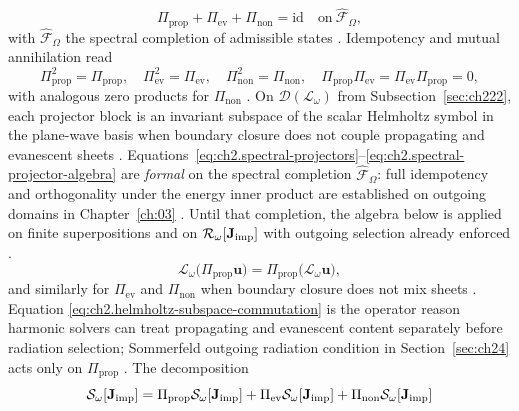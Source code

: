 \begin{equation}
\label{eq:ch2.spectral-projectors}
\Pi_{\mathrm{prop}}+\Pi_{\mathrm{ev}}+\Pi_{\mathrm{non}}=\mathrm{id}
\quad\text{on}\ \widehat{\mathcal{F}}_\Omega,
\end{equation}
with \(\widehat{\mathcal{F}}_\Omega\) the spectral completion of admissible states
\cite{stratton1941}. Idempotency and mutual annihilation read
\begin{equation}
\label{eq:ch2.spectral-projector-algebra}
\Pi_{\mathrm{prop}}^2=\Pi_{\mathrm{prop}},\quad
\Pi_{\mathrm{ev}}^2=\Pi_{\mathrm{ev}},\quad
\Pi_{\mathrm{non}}^2=\Pi_{\mathrm{non}},\quad
\Pi_{\mathrm{prop}}\Pi_{\mathrm{ev}}=\Pi_{\mathrm{ev}}\Pi_{\mathrm{prop}}=0,
\end{equation}
with analogous zero products for \(\Pi_{\mathrm{non}}\) \cite{stratton1941}. On
\(\mathcal{D}(\mathcal{L}_\omega)\) from Subsection~\ref{sec:ch222}, each projector
block is an invariant subspace of the scalar Helmholtz symbol in the plane-wave basis
when boundary closure does not couple propagating and evanescent sheets
\cite{stratton1941,harrington2001}.
Equations~\eqref{eq:ch2.spectral-projectors}--\eqref{eq:ch2.spectral-projector-algebra} are
\emph{formal} on the spectral completion $\widehat{\mathcal{F}}_\Omega$: full idempotency and
orthogonality under the energy inner product are established on outgoing domains in
Chapter~\ref{ch:03} \cite{stratton1941}. Until that completion, the algebra below is applied on
finite superpositions and on $\mathcal{R}_\omega[\mathbf{J}_{\mathrm{imp}}]$ with outgoing selection already enforced
\cite{harrington2001}.
\begin{equation}
\label{eq:ch2.helmholtz-subspace-commutation}
\mathcal{L}_\omega\big(\Pi_{\mathrm{prop}}\mathbf{u}\big)
=
\Pi_{\mathrm{prop}}\big(\mathcal{L}_\omega\mathbf{u}\big),
\end{equation}
and similarly for \(\Pi_{\mathrm{ev}}\) and \(\Pi_{\mathrm{non}}\) when boundary
closure does not mix sheets \cite{harrington2001}. Equation
\eqref{eq:ch2.helmholtz-subspace-commutation} is the operator reason harmonic
solvers can treat propagating and evanescent content separately before radiation
selection; Sommerfeld outgoing radiation condition in Section~\ref{sec:ch24} acts only on
\(\Pi_{\mathrm{prop}}\) \cite{stratton1941}.
The decomposition
\begin{equation}
\label{eq:ch2.propagating-evanescent-decomposition}
\mathcal{S}_\omega[\mathbf{J}_{\mathrm{imp}}]
=
\Pi_{\mathrm{prop}}\mathcal{S}_\omega[\mathbf{J}_{\mathrm{imp}}]
+\Pi_{\mathrm{ev}}\mathcal{S}_\omega[\mathbf{J}_{\mathrm{imp}}]
+\Pi_{\mathrm{non}}\mathcal{S}_\omega[\mathbf{J}_{\mathrm{imp}}]
\end{equation}
